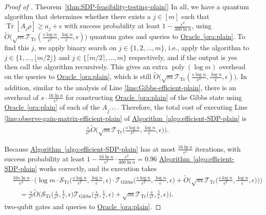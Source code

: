 \documentclass[a4paper,UKenglish,cleveref, autoref]{lipics-v2019}
\theoremstyle{remark}
\numberwithin{equation}{section}
\numberwithin{oracle}{section}
\numberwithin{remark}{section}
\newcommand{\ora}[1]{\hyperref[ora:#1]{Oracle~\ref*{ora:#1}}}
\newcommand{\thm}[1]{\hyperref[thm:#1]{Theorem~\ref*{thm:#1}}}
\newcommand{\algo}[1]{\hyperref[algo:#1]{Algorithm~\ref*{algo:#1}}}
\newcommand{\range}[1]{[#1]}
\DeclareMathOperator{\poly}{poly}
\DeclareMathOperator{\tr}{Tr}
\begin{document}
\begin{proof}[Proof of \thm{SDP-feasibility-testing-plain}]
In all, we have a quantum algorithm that determines whether there exists a $j\in\range{m}$ such that $\tr[A_{j} \rho]\geq a_{j}+\epsilon$ with success probability at least $1-\frac{\epsilon^{2}}{400\ln n}$, using $\tilde{O}\big(\sqrt{m}\mathcal{T}_{\tr}(\frac{s\log n}{\epsilon^{2}},\frac{\log n}{\epsilon},\epsilon)\big)$ quantum gates and queries to \ora{plain}. To find this $j$, we apply binary search on $j\in\{1,2,\ldots,m\}$, i.e., apply the algorithm to $j\in\{1,\ldots,\lfloor m/2\rfloor\}$ and $j\in\{\lceil m/2\rceil,\ldots,m\}$ respectively, and if the output is yes then call the algorithm recursively. This gives an extra $\poly(\log m)$ overhead on the queries to \ora{plain}, which is still $\tilde{O}\big(\sqrt{m}\mathcal{T}_{\tr}(\frac{s\log n}{\epsilon^{2}},\frac{\log n}{\epsilon},\epsilon)\big)$. In addition, similar to the analysis of Line \ref{line:Gibbs-efficient-plain}, there is an overhead of $s\cdot\frac{16\ln n}{\epsilon^{2}}$ for constructing \ora{plain} of the Gibbs state using \ora{plain} of each of the $A_{j^{(\tau)}}$. Therefore, the total cost of executing Line \ref{line:observe-gain-matrix-efficient-plain} of \algo{efficient-SDP-plain} is
\begin{align}
\frac{s}{\epsilon^{2}}\tilde{O}\Big(\sqrt{m}\mathcal{T}_{\tr}\Big(\frac{s\log n}{\epsilon^{2}},\frac{\log n}{\epsilon},\epsilon\Big)\Big).
\end{align}

Because \algo{efficient-SDP-plain} has at most $\frac{16\ln n}{\epsilon^{2}}$ iterations, with success probability at least $1-\frac{16\ln n}{\epsilon^{2}}\cdot\frac{\epsilon^{2}}{400\ln n}=0.96$ \algo{efficient-SDP-plain} works correctly, and its execution takes
\begin{align}
&\frac{16s\ln n}{\epsilon^{4}}\cdot\Big(\log m\cdot\mathcal{S}_{\tr}\Big(\frac{s\log n}{\epsilon^{2}},\frac{\log n}{\epsilon},\epsilon\Big)\cdot \mathcal{T}_{\text{Gibbs}}\Big(\frac{s\log n}{\epsilon^{2}},\frac{\log n}{\epsilon},\epsilon\Big)+\tilde{O}\Big(\sqrt{m}\mathcal{T}_{\tr}\big(\frac{s\log n}{\epsilon^{2}},\frac{\log n}{\epsilon},\epsilon\big)\Big)\Big) \nonumber \\
&\quad=\frac{s}{\epsilon^{4}}\tilde{O}\Big(\mathcal{S}_{\tr}\Big(\frac{s}{\epsilon^{2}},\frac{1}{\epsilon},\epsilon\Big)\mathcal{T}_{\text{Gibbs}}\Big(\frac{s}{\epsilon^{2}},\frac{1}{\epsilon},\epsilon\Big)+\sqrt{m}\mathcal{T}_{\tr}\Big(\frac{s}{\epsilon^{2}},\frac{1}{\epsilon},\epsilon\Big)\Big).
\end{align}
two-qubit gates and queries to \ora{plain}.
\end{proof}
\end{document}
